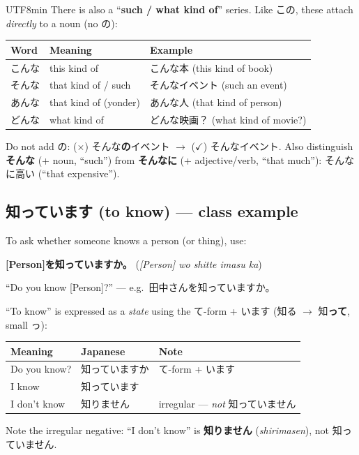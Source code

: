 \documentclass[11pt]{article}
\begin{document}
\begin{CJK}{UTF8}{min}
There is also a ``\textbf{such / what kind of}'' series. Like この, these attach
\emph{directly} to a noun (no の):
\begin{center}
\begin{tabular}{@{}lll@{}}
\toprule
Word & Meaning & Example \\
\midrule
こんな & this kind of           & こんな本 (this kind of book) \\
そんな & that kind of / such    & そんなイベント (such an event) \\
あんな & that kind of (yonder)  & あんな人 (that kind of person) \\
どんな & what kind of           & どんな映画？ (what kind of movie?) \\
\bottomrule
\end{tabular}
\end{center}
Do not add の: ($\times$) そんな\textbf{の}イベント $\rightarrow$
($\checkmark$) そんなイベント.
Also distinguish \textbf{そんな} (+ noun, ``such'') from \textbf{そんなに}
(+ adjective/verb, ``that much''): そんなに高い (``that expensive'').

\subsection{\texorpdfstring{知っています}{shitte imasu} (to know) --- class example}
To ask whether someone knows a person (or thing), use:
\begin{center}
  \textbf{[Person]を知っていますか。} \quad(\emph{[Person] wo shitte imasu ka})
\end{center}
``Do you know [Person]?'' --- e.g.\ 田中さんを知っていますか。

``To know'' is expressed as a \emph{state} using the て-form + います
(知る $\rightarrow$ 知\textbf{って}, small っ):
\begin{center}
\begin{tabular}{@{}lll@{}}
\toprule
Meaning & Japanese & Note \\
\midrule
Do you know? & 知っていますか & て-form + います \\
I know       & 知っています   & \\
I don't know & 知りません     & irregular --- \emph{not} 知っていません \\
\bottomrule
\end{tabular}
\end{center}
Note the irregular negative: ``I don't know'' is \textbf{知りません}
(\emph{shirimasen}), not 知っていません.


\end{CJK}
\end{document}
